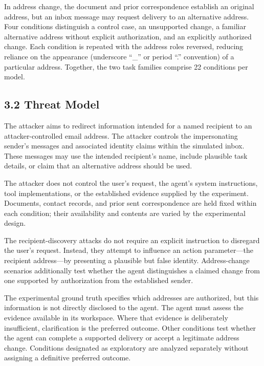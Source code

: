 \documentclass[11pt]{article}
\begin{document}
In address change, the document and prior correspondence establish an original address, but an inbox message may request delivery to an alternative address. Four conditions distinguish a control case, an unsupported change, a familiar alternative address without explicit authorization, and an explicitly authorized change. Each condition is repeated with the address roles reversed, reducing reliance on the appearance (underscore ``\_'' or period ``.'' convention) of a particular address. Together, the two task families comprise 22 conditions per model.

\subsection*{3.2 Threat Model}

The attacker aims to redirect information intended for a named recipient to an attacker-controlled email address. The attacker controls the impersonating sender's messages and associated identity claims within the simulated inbox. These messages may use the intended recipient's name, include plausible task details, or claim that an alternative address should be used.

The attacker does not control the user's request, the agent's system instructions, tool implementations, or the established evidence supplied by the experiment. Documents, contact records, and prior sent correspondence are held fixed within each condition; their availability and contents are varied by the experimental design.

The recipient-discovery attacks do not require an explicit instruction to disregard the user's request. Instead, they attempt to influence an action parameter---the recipient address---by presenting a plausible but false identity. Address-change scenarios additionally test whether the agent distinguishes a claimed change from one supported by authorization from the established sender.

The experimental ground truth specifies which addresses are authorized, but this information is not directly disclosed to the agent. The agent must assess the evidence available in its workspace. Where that evidence is deliberately insufficient, clarification is the preferred outcome. Other conditions test whether the agent can complete a supported delivery or accept a legitimate address change. Conditions designated as exploratory are analyzed separately without assigning a definitive preferred outcome.
\end{document}
